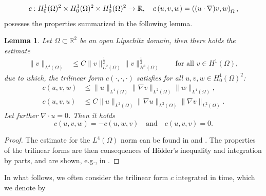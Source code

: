 \documentclass{m2an}
\newcommand\blue[1]{\textcolor{black}{#1}}
\newtheorem{lemma}[theorem]{Lemma}
\newcommand{\R}{\mathbb{R}}
\newcommand{\Oprod}[1]{\left( #1 \right)_{\Omega}}
\newcommand{\cO}[1]{c\left( #1 \right)}
\newcommand{\Hozs}{H^1_0(\Omega)^2}
\begin{document}
\begin{equation*}
  c: \blue{\Hozs \times \Hozs \times \Hozs}  \rightarrow \R, \quad \cO{u,v,w} = \Oprod{(u\cdot \nabla)v,w},
\end{equation*}
posesses the properties summarized in the following lemma.
\begin{lemma}\label{lemm:c_swap}
  Let $\Omega \subset \R^2$ be an open Lipschitz domain, then there holds the estimate
  \begin{align}
    \|v\|_{L^4(\Omega)} &\le C\|v\|_{L^2(\Omega)}^{\frac{1}{2}}\|v\|_{H^1(\Omega)}^{\frac{1}{2}}
    \qquad \text{for all } v \in H^1(\Omega),
    \label{eq:l4_interpol_general}
  \end{align}
  due to which, the trilinear form $\cO{\cdot,\cdot,\cdot}$ satisfies for all $u,v,w \in H^1_0(\Omega)^2$:
  \begin{align*}
    \cO{u,v,w} & \le \|u\|_{L^4(\Omega)} \|\nabla v\|_{L^2(\Omega)} \|w\|_{L^4(\Omega)},\\
    \cO{u,v,u} & \le C\|u\|_{L^2(\Omega)} \|\nabla u\|_{L^2(\Omega)}\|\nabla v\|_{L^2(\Omega)}.
  \end{align*}
  Let further $\nabla \cdot u = 0$. Then it holds
  \begin{equation*}
    \cO{u,v,w} = - \cO{u,w,v} \quad \text{and} \quad 
    \cO{u,v,v} = 0.
  \end{equation*}
\end{lemma}
\begin{proof}
  The estimate for the $L^4(\Omega)$ norm can be found in \cite[Lemma II.3.2]{galdi_introduction_2011}
  and \cite[Theorem 3]{adams_cone_1977}.
  The properties of the trilinear forms are then consequences of \blue{Hölder's} inequality and
  integration by parts, and are shown, e.g., in \cite[Lemma IX.2.1]{galdi_introduction_2011}. 
\end{proof}
In what follows, we often consider the trilinear form $c$ integrated in time, which we denote by
\end{document}
